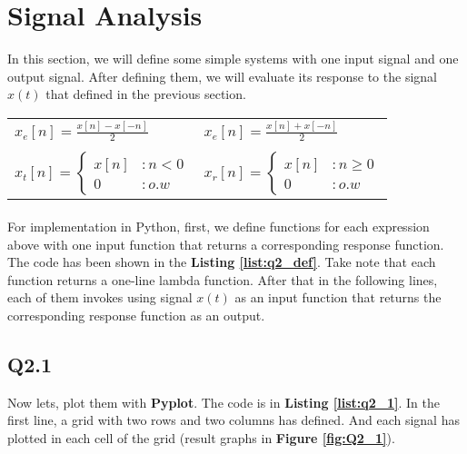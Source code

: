 \section{Signal Analysis}
In this section, we will define some 
simple systems with one input signal and one output 
signal. After defining them, we will evaluate its 
response to the signal $x(t)$ that defined in the
 previous section.
 \begin{center}
\begin{tabular}{ p{5cm} p{5cm} }
 $x_e[n]=\frac{x[n]-x[-n]}{2}$ & $x_e[n]=\frac{x[n]+x[-n]}{2}$  \\ 
  & \\
 $
  x_t[n] = \begin{cases}
   x[n] &: n < 0\\
   0 &: o.w\end{cases}
 $ & $
  x_r[n] = \begin{cases}
   x[n] &: n\geq 0\\
   0 &: o.w\end{cases}
 $  \\  
 
\end{tabular}
\end{center}
\paragraph{}For implementation in Python, first, we 
define functions for each expression above with one input 
function that returns a corresponding response 
function. The code has been shown in the 
\textbf{Listing \ref{list:q2_def}}. Take note that each function 
returns a one-line lambda function.
After that in the following lines, each 
of them invokes using signal $x(t)$ as an input 
function that returns the corresponding response 
function as an output.


\subsection{Q2.1}
Now lets, plot them with 
\textbf{Pyplot}. The code is in 
\textbf{Listing \ref{list:q2_1}}. In the first line, 
a grid with two rows and two columns has defined.
 And each signal has plotted in each cell of the grid (result graphs in \textbf{Figure \ref{fig:Q2_1}}).


